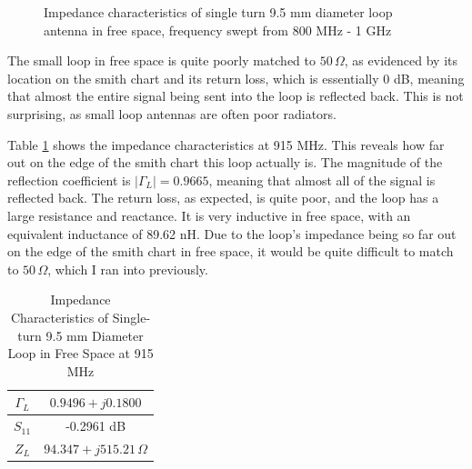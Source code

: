 \documentclass[12pt,onecolumn,titlepage]{article}
\begin{document}
\begin{figure}[htbp]
	\centering
		\quad
	\label{fig:sngle_loop_FS}
	\caption{Impedance characteristics of single turn 9.5 mm diameter loop antenna in free space, frequency swept from 800 MHz - 1 GHz}
\end{figure}


The small loop in free space is quite poorly matched to $50 \, \Omega$, as evidenced by its location on the smith chart and its return loss, which is essentially 0 dB, meaning that almost the entire signal being sent into the loop is reflected back. This is not surprising, as small loop antennas are often poor radiators. 

Table \ref{tab:sngl_loop_FS} shows the impedance characteristics at 915 MHz. This reveals how far out on the edge of the smith chart this loop actually is. The magnitude of the reflection coefficient is $|\Gamma_L| = 0.9665$, meaning that almost all of the signal is reflected back. The return loss, as expected, is quite poor, and the loop has a large resistance and reactance. It is very inductive in free space, with an equivalent inductance of 89.62 nH. Due to the loop's impedance being so far out on the edge of the smith chart in free space, it would be quite difficult to match to $50 \, \Omega$, which I ran into previously. 


\begin{table}[h]
\centering
	\caption{Impedance Characteristics of Single-turn 9.5 mm Diameter Loop in Free Space at 915 MHz}
	\begin{tabular}{| c || c |}
	\hline
	$\Gamma_L$ & $0.9496+j0.1800$ \\ \hline
	$S_{11}$ & -0.2961 dB \\ \hline
	$Z_L$ & $94.347 + j515.21 \, \Omega$ \\ \hline
	\end{tabular}
\label{tab:sngl_loop_FS}
\end{table}
\end{document}
